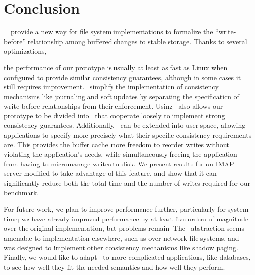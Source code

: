 \section{Conclusion}
\label{sec:conclusion}

\Kudos\ \patches\ provide a new way for file system implementations to formalize
the ``write-before'' relationship among buffered changes to stable storage.
%
Thanks to several optimizations,
\begin{comment}
which significantly decrease the overhead
required to use \patches, both in terms of the amount of memory required and the
CPU time spent.
%
We evaluate a prototype file system implementation using \patches\ to determine
whether these ideas can be used in production file systems.
%
\end{comment}
the
performance of our prototype is usually at least as fast as Linux when
configured to provide similar consistency guarantees, although in some cases it
still requires improvement.
%
\Patches\ simplify the implementation of consistency mechanisms like journaling
and soft updates by separating the specification of write-before
relationships from their enforcement.
%
Using \patches\ also allows our prototype to be divided into \modules\ that
cooperate loosely to implement strong consistency guarantees.
%
Additionally, \patches\ can be extended into user space, allowing applications to
specify more precisely what their specific consistency requirements are.
%
This provides the buffer cache more freedom to reorder writes without violating
the application's needs, while simultaneously freeing the application from
having to micromanage writes to disk.
%
We present results for an IMAP server modified to take advantage of this
feature, and show that it can significantly reduce both the total time and the
number of writes required for our benchmark.


For future work, we plan to improve performance further, particularly for
system time; %
%
we have already improved performance by at least five orders of magnitude
over the original implementation, but problems remain.
%
The \patch\ abstraction seems amenable to implementation elsewhere,
such as over network file systems, and was designed to implement other consistency
mechanisms like shadow paging.
%
Finally, we would like to adapt \patchgroups\ to more complicated
applications, like databases, to see how well they fit the needed semantics and
how well they perform.
